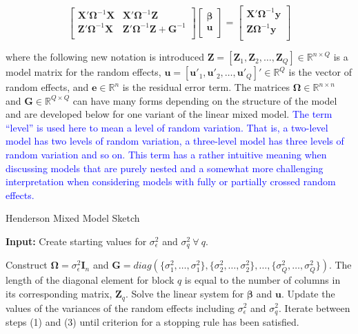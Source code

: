 \documentclass[12pt]{article}
\begin{document}
\begin{equation}
\label{eqn:henderson:eiv}
\left [ 
\begin{array}{cc}
\bm{X'}\bm{\Omega}^{-1}\bm{X} & \bm{X'}\bm{\Omega}^{-1}\bm{Z}\\
\bm{Z}'\bm{\Omega}^{-1}\bm{X} & \bm{Z}'\bm{\Omega}^{-1}\bm{Z} + \bm{G}^{-1}\\
\end{array}
\right ]
\left [ 
\begin{array}{c}
\bm{\beta}\\
\bm{u}\\
\end{array}
\right ] = 
\left [ 
\begin{array}{c}
\bm{X'}\bm{\Omega}^{-1}\bm{y} \\
\bm{Z}\bm{\Omega}^{-1}\bm{y}\\
\end{array}
\right] 
\end{equation}


\noindent where the following new notation is introduced $\bm{Z} = [\bm{Z}_1, \bm{Z}_2, \ldots, \bm{Z}_Q] \in \mathbb{R}^{n \times Q}$ is a model matrix for the random effects, $\bm{u} = [\bm{u}'_1, \bm{u}'_2, \ldots, \bm{u}'_Q]' \in \mathbb{R}^Q$ is the vector of random effects, and $\bm{e} \in \mathbb{R}^n$ is the residual error term. The matrices $\bm{\Omega} \in \mathbb{R}^{n \times n}$ and $\bm{G} \in \mathbb{R}^{Q \times Q}$ can have many forms depending on the structure of the model and are developed below for one variant of the linear mixed model. \textcolor{blue}{The term ``level'' is used here to mean a level of random variation. That is, a two-level model has two levels of random variation, a three-level model has three levels of random variation and so on. This term has a rather intuitive meaning when discussing models that are purely nested and a somewhat more challenging interpretation when considering models with fully or partially crossed random effects.}

\begin{algorithm}
\caption{Henderson Mixed Model Sketch}
\label{algo:a}
	\hspace*{\algorithmicindent} \textbf{Input:} Create starting values for $\sigma^2_{\epsilon}$ and $\sigma^2_{q} \ \forall \ q$.
\begin{algorithmic}[1]
	\State Construct $\bm{\Omega} = \sigma^2_{\epsilon}\bm{I}_n$ and $\bm{G}=diag(\{\sigma^2_{1}, \ldots, \sigma^2_{1}\}, \{\sigma^2_{2}, \ldots, \sigma^2_{2}\}, \ldots, \{\sigma^2_{Q}, \ldots, \sigma^2_{Q}\} )$. The length of the diagonal element for block $q$ is equal to the number of columns in its corresponding matrix, $\bm{Z}_q$.
	\State Solve the linear system for $\bm{\beta}$ and $\bm{u}$.
	\State Update the values of the variances of the random effects including $\sigma^2_{\epsilon}$ and $\sigma^2_{q}$.
	\State Iterate between steps (1) and (3) until criterion for a stopping rule has been satisfied. 
\end{algorithmic}
\end{algorithm}
\end{document}
